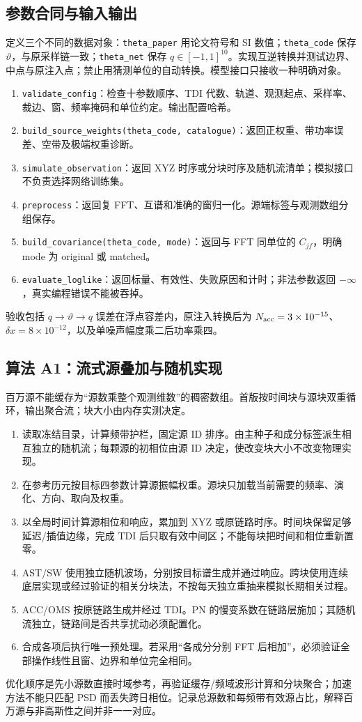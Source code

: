 \documentclass[UTF8,fontset=none,a4paper,11pt]{ctexart}
\begin{document}
\subsection{参数合同与输入输出}
定义三个不同的数据对象：\texttt{theta\_paper} 用论文符号和 SI 数值；\texttt{theta\_code} 保存 $\vartheta$，与原采样链一致；\texttt{theta\_net} 保存 $q\in[-1,1]^{10}$。实现互逆转换并测试边界、中点与原注入点；禁止用猜测单位的自动转换。模型接口只接收一种明确对象。
\begin{enumerate}
\item \texttt{validate\_config}：检查十参数顺序、TDI 代数、轨道、观测起点、采样率、裁边、窗、频率掩码和单位约定。输出配置哈希。
\item \texttt{build\_source\_weights(theta\_code, catalogue)}：返回正权重、带功率误差、空带及极端权重诊断。
\item \texttt{simulate\_observation}：返回 XYZ 时序或分块时序及随机流清单；模拟接口不负责选择网络训练集。
\item \texttt{preprocess}：返回复 FFT、互谱和准确的窗归一化。源端标签与观测数组分组保存。
\item \texttt{build\_covariance(theta\_code, mode)}：返回与 FFT 同单位的 $C_{jf}$，明确 mode 为 original 或 matched。
\item \texttt{evaluate\_loglike}：返回标量、有效性、失败原因和计时；非法参数返回 $-\infty$，真实编程错误不能被吞掉。
\end{enumerate}
验收包括 $q\to\vartheta\to q$ 误差在浮点容差内，原注入转换后为 $N_{\rm acc}=3\times10^{-15}$、$\delta x=8\times10^{-12}$，以及单噪声幅度乘二后功率乘四。
\subsection{算法 A1：流式源叠加与随机实现}
百万源不能缓存为“源数乘整个观测维数”的稠密数组。首版按时间块与源块双重循环，输出聚合流；块大小由内存实测决定。
\begin{enumerate}
\item 读取冻结目录，计算频带护栏，固定源 ID 排序。由主种子和成分标签派生相互独立的随机流；每颗源的初相位由源 ID 决定，使改变块大小不改变物理实现。
\item 在参考历元按目标四参数计算源振幅权重。源块只加载当前需要的频率、演化、方向、取向及权重。
\item 以全局时间计算源相位和响应，累加到 XYZ 或原链路时序。时间块保留足够延迟/插值边缘，完成 TDI 后只取有效中间区；不能每块把时间和相位重新置零。
\item AST/SW 使用独立随机波场，分别按目标谱生成并通过响应。跨块使用连续底层实现或经过验证的相关分块法，不按每天独立重抽来模拟长期相关过程。
\item ACC/OMS 按原链路生成并经过 TDI。PN 的慢变系数在链路层施加；其随机流独立，链路间是否共享扰动必须配置化。
\item 合成各项后执行唯一预处理。若采用“各成分分别 FFT 后相加”，必须验证全部操作线性且窗、边界和单位完全相同。
\end{enumerate}
优化顺序是先小源数直接时域参考，再验证缓存/频域波形计算和分块聚合；加速方法不能只匹配 PSD 而丢失跨日相位。记录总源数和每频带有效源占比，解释百万源与非高斯性之间并非一一对应。
\end{document}
